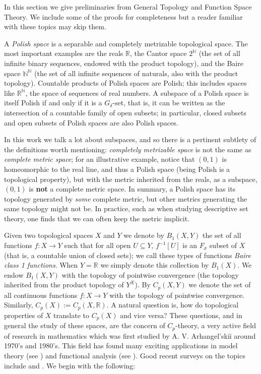\documentclass[psamsfonts]{amsart}
\theoremstyle{definition}
\theoremstyle{remark}
\numberwithin{equation}{section}
\begin{document}
In this section we give preliminaries from General Topology and Function Space Theory. We include some of the proofs for completeness but a reader familiar with these topics may skip them.

A \emph{Polish space} is a separable and completely metrizable topological space. The most important examples are the reals $\mathbb R$, the Cantor space $2^\mathbb N$ (the set of all infinite binary sequences, endowed with the product topology), and the Baire space $\mathbb N^\mathbb N$ (the set of all infinite sequences of naturals, also with the product topology). Countable products of Polish spaces are Polish; this includes spaces like $\mathbb R^\mathbb N$, the space of sequences of real numbers. A subspace of a Polish space is itself Polish if and only if it is a $G_\delta$-set, that is, it can be written as the intersection of a countable family of open subsets; in particular, closed subsets and open subsets of Polish spaces are also Polish spaces.

In this work we talk a lot about subspaces, and so there is a pertinent subtlety of the definitions worth mentioning: \emph{completely metrizable space} is not the same as \emph{complete metric space}; for an illustrative example, notice that $(0,1)$ is homeomorphic to the real line, and thus a Polish space (being Polish is a topological property), but with the metric inherited from the reals, as a subspace, $(0,1)$ is \textbf{not} a complete metric space. In summary, a Polish space has its topology generated by \emph{some} complete metric, but other metrics generating the same topology might not be. In practice, such as when studying descriptive set theory, one finds that we can often keep the metric implicit.

Given two topological spaces $X$ and $Y$ we denote by $B_1(X,Y)$ the set of all functions $f:X\to Y$ such that for all open $U\subseteq Y$, $f^{-1}[U]$ is an $F_\sigma$ subset of $X$ (that is, a countable union of closed sets); we call these types of functions \emph{Baire class 1 functions}. When $Y=\mathbb{R}$ we simply denote this collection by $B_1(X)$. We endow $B_1(X,Y)$ with the topology of pointwise convergence (the topology inherited from the product topology of $Y^X$). By $C_p(X,Y)$ we denote the set of all continuous functions $f:X\rightarrow Y$ with the topology of pointwise convergence. Similarly, $C_p(X):=C_p(X,\mathbb{R})$. A natural question is, how do topological properties of $X$ translate to $C_p(X)$ and vice versa? These questions, and in general the study of these spaces, are the concern of $C_p$-theory, a very active field of research in mathematics which was first studied by A. V. Arhangel’skiĭ around 1970's and 1980's. This field has found many exciting applications in model theory (see \cite{hamel2021cp}) and functional analysis (see \cite{iovino2020banach}). Good recent surveys on the topics include \cite{hamel2023cp} and \cite{tkachuk2011cp}. We begin with the following:
\end{document}
